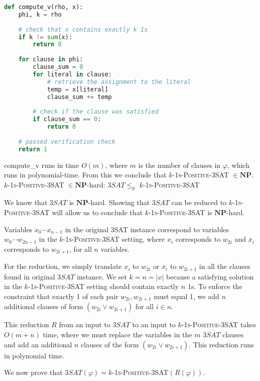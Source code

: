 \documentclass[11pt]{article}
\begin{document}
\begin{lstlisting}[language=Python]
def compute_v(rho, x):
    phi, k = rho
    
    # check that x contains exactly k 1s
    if k != sum(x):
        return 0
    
    for clause in phi:
        clause_sum = 0
        for literal in clause:
            # retrieve the assignment to the literal
            temp = x[literal]
            clause_sum += temp
        
        # check if the clause was satisfied
        if clause_sum == 0:
            return 0
    
    # passed verification check
    return 1
\end{lstlisting}

compute\_v runs in time $O(m)$, where $m$ is the number of clauses in $\varphi$, which runs in polynomial-time. From this we conclude that \textsc{$k$-1s-Positive-3SAT} $\in \mathbf{NP}$.\\

\textsc{$k$-1s-Positive-3SAT} $\in \mathbf{NP}$-hard: $3SAT \leq_p$ \textsc{$k$-1s-Positive-3SAT}

We know that $3SAT$ is $\mathbf{NP}$-hard. Showing that $3SAT$ can be reduced to \textsc{$k$-1s-Positive-3SAT} will allow us to conclude that \textsc{$k$-1s-Positive-3SAT} is $\mathbf{NP}$-hard.

Variables $x_0 \cdots x_{n-1}$ in the original 3SAT instance correspond to variables $w_0 \cdots w_{2n-1}$ in the \textsc{$k$-1s-Positive-3SAT} setting, where $x_i$ corresponds to $w_{2i}$ and $\overline{x}_i$ corresponds to $w_{2i + 1}$, for all $n$ variables.

For the reduction, we simply translate $x_i$ to $w_{2i}$ or $\overline{x}_i$ to $w_{2i+1}$ in all the clauses found in original $3SAT$ instance. We set $k=n=|x|$ because a satisfying solution in the \textsc{$k$-1s-Positive-3SAT} setting should contain exactly $n$ 1s. To enforce the constraint that exactly 1 of each pair $w_{2i}, w_{2i+1}$ must equal 1, we add $n$ additional clauses of form $(w_{2i} \lor w_{2i+1})$ for all $i \in n$.

This reduction $R$ from an input to $3SAT$ to an input to \textsc{$k$-1s-Positive-3SAT} takes $O(m + n)$ time, where we must replace the variables in the $m$ $3SAT$ clauses and add an additional $n$ clauses of the form $(w_{2i} \lor w_{2i+1})$. This reduction runs in polynomial time.

We now prove that $3SAT(\varphi) = $\textsc{$k$-1s-Positive-3SAT}$(R(\varphi))$.
\end{document}
